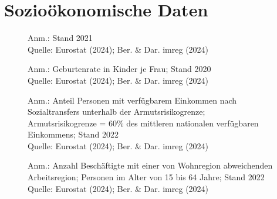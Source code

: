 

\section{Sozioökonomische Daten}


\begin{figure}[p]
	{\centering {}}
	\label{map:lebenserw}
	\begin{spacing}{1} \scriptsize
		Anm.: Stand 2021\\
		Quelle: Eurostat (2024); Ber. \& Dar. imreg (2024) \end{spacing}
\end{figure}


\begin{figure}[p]
	{\centering {}}
	\label{map:geburten}
	\begin{spacing}{1} \scriptsize
		Anm.: Geburtenrate in Kinder je Frau; Stand 2020\\
		Quelle: Eurostat (2024); Ber. \& Dar. imreg (2024) \end{spacing}
\end{figure}


\begin{figure}[p]
	{\centering {}}
	\label{map:armut}
	\begin{spacing}{1} \scriptsize
		Anm.: Anteil Personen mit verfügbarem Einkommen nach Sozialtransfers unterhalb der Armutsrisikogrenze; Armutsrisikogrenze = 60\% des mittleren nationalen verfügbaren Einkommens; Stand 2022\\
		Quelle: Eurostat (2024); Ber. \& Dar. imreg (2024) \end{spacing}
\end{figure}


\begin{figure}[p]
	{\centering {}}
	\label{map:pendler}
	\begin{spacing}{1} \scriptsize
		Anm.: Anzahl Beschäftigte mit einer von Wohnregion abweichenden Arbeitsregion; Personen im Alter von 15 bis 64 Jahre; Stand 2022\\
		Quelle: Eurostat (2024); Ber. \& Dar. imreg (2024) \end{spacing}
\end{figure}


